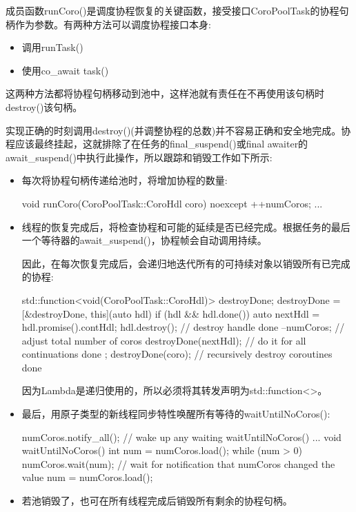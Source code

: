 成员函数runCoro()是调度协程恢复的关键函数，接受接口CoroPoolTask的协程句柄作为参数。有两种方法可以调度协程接口本身:

\begin{itemize}
\item
调用runTask()

\item
使用co\_await task()
\end{itemize}

这两种方法都将协程句柄移动到池中，这样池就有责任在不再使用该句柄时destroy()该句柄。

实现正确的时刻调用destroy()(并调整协程的总数)并不容易正确和安全地完成。协程应该最终挂起，这就排除了在任务的final\_suspend()或final awaiter的await\_suspend()中执行此操作，所以跟踪和销毁工作如下所示:

\begin{itemize}
\item
每次将协程句柄传递给池时，将增加协程的数量:

\begin{cpp}
void runCoro(CoroPoolTask::CoroHdl coro) noexcept {
	++numCoros;
	...
}
\end{cpp}

\item
线程的恢复完成后，将检查协程和可能的延续是否已经完成。根据任务的最后一个等待器的await\_suspend()，协程帧会自动调用持续。

因此，在每次恢复完成后，会递归地迭代所有的可持续对象以销毁所有已完成的协程:

\begin{cpp}
std::function<void(CoroPoolTask::CoroHdl)> destroyDone;
destroyDone = [&destroyDone, this](auto hdl) {
					if (hdl && hdl.done()) {
						auto nextHdl = hdl.promise().contHdl;
						hdl.destroy(); // destroy handle done
						--numCoros; // adjust total number of coros
						destroyDone(nextHdl); // do it for all continuations done
					}
				};
destroyDone(coro); // recursively destroy coroutines done
\end{cpp}

因为Lambda是递归使用的，所以必须将其转发声明为std::function<>。

\item
最后，用原子类型的新线程同步特性唤醒所有等待的waitUntilNoCoros():

\begin{cpp}
numCoros.notify_all(); // wake up any waiting waitUntilNoCoros()
...
void waitUntilNoCoros() {
	int num = numCoros.load();
	while (num > 0) {
		numCoros.wait(num); // wait for notification that numCoros changed the value
		num = numCoros.load();
	}
}
\end{cpp}

\item
若池销毁了，也可在所有线程完成后销毁所有剩余的协程句柄。
\end{itemize}

